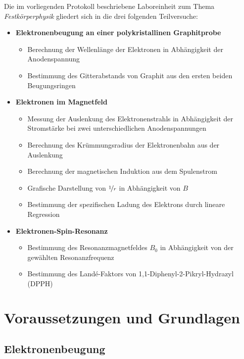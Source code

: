 \documentclass[ngerman]{scrartcl}
\begin{document}
Die im vorliegenden Protokoll beschriebene Laboreinheit zum Thema \textit{Festkörperphysik} gliedert sich in die drei folgenden Teilversuche:
%
\begin{itemize}
    \item \textbf{Elektronenbeugung an einer polykristallinen Graphitprobe}
          \begin{itemize}
              \item Berechnung der Wellenlänge der Elektronen in Abhängigkeit der Anodenspannung
              \item Bestimmung des Gitterabstands von Graphit aus den ersten beiden Beugungsringen
          \end{itemize}
    \item \textbf{Elektronen im Magnetfeld}
          \begin{itemize}
              \item Messung der Auslenkung des Elektronenstrahls in Abhängigkeit der Stromstärke bei zwei unterschiedlichen Anodenspannungen
              \item Berechnung des Krümmungsradius der Elektronenbahn aus der Auslenkung
              \item Berechnung der magnetischen Induktion aus dem Spulenstrom
              \item Grafische Darstellung von $\nicefrac{1}{r}$ in Abhängigkeit von $B$
              \item Bestimmung der spezifischen Ladung des Elektrons durch lineare Regression
          \end{itemize}
    \item \textbf{Elektronen-Spin-Resonanz}
          \begin{itemize}
              \item Bestimmung des Resonanzmagnetfeldes $B_0$ in Abhängigkeit von der gewählten Resonanzfrequenz
              \item Bestimmung des Landé-Faktors von 1,1-Diphenyl-2-Pikryl-Hydrazyl (DPPH)
          \end{itemize}

\end{itemize}



\section{Voraussetzungen und Grundlagen}
\label{sec:voraussetzungen_grundlagen}

\subsection[Elektronenbeugung]{Elektronenbeugung \cite{ref:angabe_elektronen}}
\label{subsec:grundlagen_elektronenbeugung}
\end{document}
